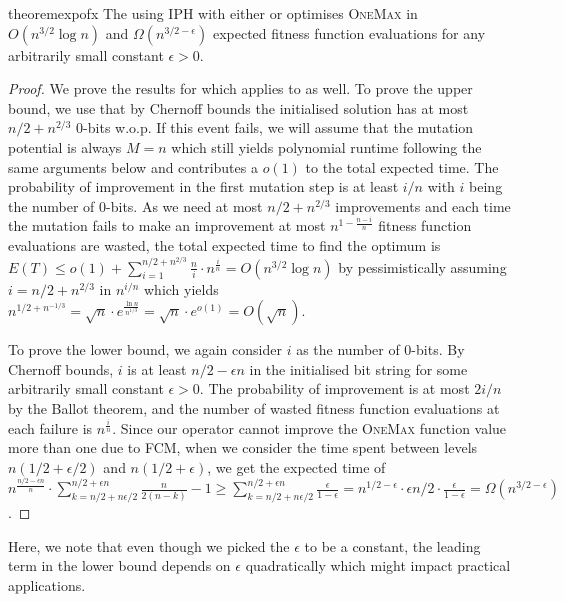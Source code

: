 \documentclass[lettersize,journal]{IEEEtran}
\begin{document}
\begin{restatable}{theorem}{expofx} \label{cor:omexpohd}
The {\oneoneIA } using IPH with either {\expoF } or {\expoHD } optimises \textsc{OneMax} in $O(n^{3/2} \log 
n)$ and $\Omega(n^{3/2-\epsilon})$ expected fitness function evaluations for 
any arbitrarily small constant $\epsilon>0$.
\end{restatable}

\begin{proof}
We prove the results for \expoF{} which applies to \expoHD{} as well. 
To prove the upper bound, we use that by Chernoff bounds the initialised solution has at most $n/2+ n^{2/3}$ 0-bits w.o.p. {\color{blue} If this event fails, we will assume that the mutation potential is always $M=n$ which still yields polynomial runtime following the same arguments below and contributes a $o(1)$ to the total expected time}. The probability of improvement in the first mutation step is at least $i/n$ with $i$ being the number of 0-bits. As we need at most $n/2+n^{2/3}$ improvements and each time the mutation fails to make an improvement at most $n^{1-\frac{n-i}{n}}$ fitness function evaluations are wasted, the total expected time to find the optimum is $E(T) \leq o(1) + \sum_{i=1}^{n/2+n^{2/3}} \frac{n}{i} \cdot n^{\frac{i}{n}}= O (n^{3/2} \log n)$ by pessimistically assuming $i=n/2+n^{2/3}$ in $n^{i/n}$ {\color{blue} which yields $n^{1/2+n^{-1/3}}=\sqrt{n} \cdot e^{\frac{\ln n}{n^{1/3}}}=\sqrt{n} \cdot e^{o(1)}=O(\sqrt{n})$}.

To prove the lower bound, we again consider $i$ as the number of 0-bits. By Chernoff 
bounds, $i$ is at least $n/2-\epsilon n$  in the initialised bit string for some arbitrarily small constant $\epsilon>0$. 
The probability of improvement is at most $2i/n$ by the Ballot theorem, and the number of wasted fitness function evaluations at each failure is 
$n^{\frac{i}{n}}$. {\color{blue} Since our operator cannot improve the \textsc{OneMax} function value more than one due to FCM,} when we consider the time spent between levels $n(1/2 + 
\epsilon/2)$ and $n(1/2+\epsilon)$, we get the expected time of 
{\color{blue}$n^{\frac{n/2-\epsilon n}{n}} \cdot \sum_{k=n/2+n\epsilon/2 }^{n/2+\epsilon 
n} \frac{n}{2(n-k)}-1 \geq \sum_{k=n/2+n\epsilon/2 }^{n/2+\epsilon 
n} \frac{\epsilon}{1-\epsilon}=n^{1/2-\epsilon} \cdot \epsilon n/2 \cdot \frac{\epsilon}{1-\epsilon}= 
\Omega(n^{3/2-\epsilon})$.}
\end{proof}

{\color{blue}Here, we note that even though we picked the $\epsilon$ to be a constant, the leading term in the lower bound depends on $\epsilon$ quadratically which might impact practical applications.}
\end{document}
